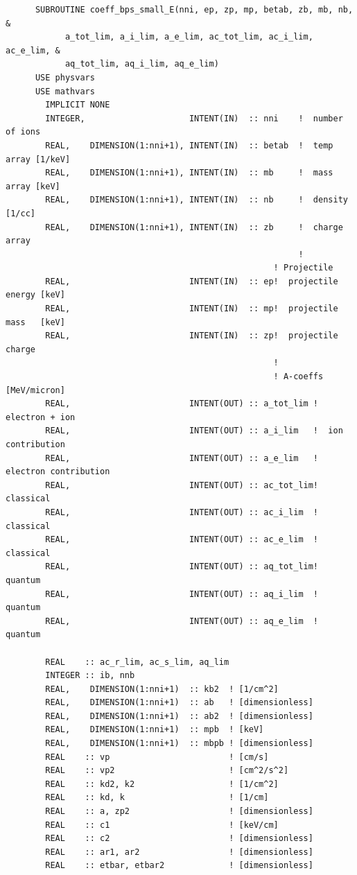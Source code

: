 \documentclass[preprint,12pt,eqsecnum,nofootinbib,amsmath,amssymb]{revtex4}
\begin{document}
{\begin{verbatim}
      SUBROUTINE coeff_bps_small_E(nni, ep, zp, mp, betab, zb, mb, nb,   &
            a_tot_lim, a_i_lim, a_e_lim, ac_tot_lim, ac_i_lim, ac_e_lim, &
            aq_tot_lim, aq_i_lim, aq_e_lim)
      USE physvars
      USE mathvars      
        IMPLICIT NONE
        INTEGER,                     INTENT(IN)  :: nni    !  number of ions
        REAL,    DIMENSION(1:nni+1), INTENT(IN)  :: betab  !  temp array [1/keV]
        REAL,    DIMENSION(1:nni+1), INTENT(IN)  :: mb     !  mass array [keV]
        REAL,    DIMENSION(1:nni+1), INTENT(IN)  :: nb     !  density [1/cc]
        REAL,    DIMENSION(1:nni+1), INTENT(IN)  :: zb     !  charge array
                                                           !
                                                      ! Projectile  
        REAL,                        INTENT(IN)  :: ep!  projectile energy [keV]
        REAL,                        INTENT(IN)  :: mp!  projectile mass   [keV]
        REAL,                        INTENT(IN)  :: zp!  projectile charge
                                                      !
                                                      ! A-coeffs [MeV/micron]
        REAL,                        INTENT(OUT) :: a_tot_lim !  electron + ion
        REAL,                        INTENT(OUT) :: a_i_lim   !  ion contribution
        REAL,                        INTENT(OUT) :: a_e_lim   !  electron contribution
        REAL,                        INTENT(OUT) :: ac_tot_lim!  classical
        REAL,                        INTENT(OUT) :: ac_i_lim  !  classical
        REAL,                        INTENT(OUT) :: ac_e_lim  !  classical
        REAL,                        INTENT(OUT) :: aq_tot_lim!  quantum
        REAL,                        INTENT(OUT) :: aq_i_lim  !  quantum
        REAL,                        INTENT(OUT) :: aq_e_lim  !  quantum

        REAL    :: ac_r_lim, ac_s_lim, aq_lim
        INTEGER :: ib, nnb
        REAL,    DIMENSION(1:nni+1)  :: kb2  ! [1/cm^2]
        REAL,    DIMENSION(1:nni+1)  :: ab   ! [dimensionless]
        REAL,    DIMENSION(1:nni+1)  :: ab2  ! [dimensionless]
        REAL,    DIMENSION(1:nni+1)  :: mpb  ! [keV]
        REAL,    DIMENSION(1:nni+1)  :: mbpb ! [dimensionless]
        REAL    :: vp                        ! [cm/s]
        REAL    :: vp2                       ! [cm^2/s^2]
        REAL    :: kd2, k2                   ! [1/cm^2]
        REAL    :: kd, k                     ! [1/cm]
        REAL    :: a, zp2                    ! [dimensionless]
        REAL    :: c1                        ! [keV/cm]
        REAL    :: c2                        ! [dimensionless]
        REAL    :: ar1, ar2                  ! [dimensionless]
        REAL    :: etbar, etbar2             ! [dimensionless]


\end{verbatim}}
\end{document}
